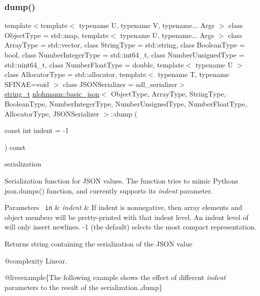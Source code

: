 \subsubsection{\texorpdfstring{dump()}{dump()}}
{\footnotesize\ttfamily template$<$template$<$ typename U, typename V, typename... Args $>$ class Object\+Type = std\+::map, template$<$ typename U, typename... Args $>$ class Array\+Type = std\+::vector, class String\+Type  = std\+::string, class Boolean\+Type  = bool, class Number\+Integer\+Type  = std\+::int64\+\_\+t, class Number\+Unsigned\+Type  = std\+::uint64\+\_\+t, class Number\+Float\+Type  = double, template$<$ typename U $>$ class Allocator\+Type = std\+::allocator, template$<$ typename T, typename S\+F\+I\+N\+A\+E=void $>$ class J\+S\+O\+N\+Serializer = adl\+\_\+serializer$>$ \\
\mbox{\hyperlink{classnlohmann_1_1basic__json_a61f8566a1a85a424c7266fb531dca005}{string\+\_\+t}} \mbox{\hyperlink{classnlohmann_1_1basic__json}{nlohmann\+::basic\+\_\+json}}$<$ Object\+Type, Array\+Type, String\+Type, Boolean\+Type, Number\+Integer\+Type, Number\+Unsigned\+Type, Number\+Float\+Type, Allocator\+Type, J\+S\+O\+N\+Serializer $>$\+::dump (\begin{DoxyParamCaption}\item[{const int}]{indent = {\ttfamily -\/1} }\end{DoxyParamCaption}) const\hspace{0.3cm}{\ttfamily [inline]}}



serialization 

Serialization function for J\+S\+ON values. The function tries to mimic Python\textquotesingle{}s {\ttfamily json.\+dumps()} function, and currently supports its {\itshape indent} parameter.


\begin{DoxyParams}[1]{Parameters}
\mbox{\texttt{ in}}  & {\em indent} & If indent is nonnegative, then array elements and object members will be pretty-\/printed with that indent level. An indent level of {} will only insert newlines. {\ttfamily -\/1} (the default) selects the most compact representation.\\
\hline
\end{DoxyParams}
\begin{DoxyReturn}{Returns}
string containing the serialization of the J\+S\+ON value
\end{DoxyReturn}
@complexity Linear.

@liveexample\{The following example shows the effect of different {\itshape indent} parameters to the result of the serialization.,dump\}

